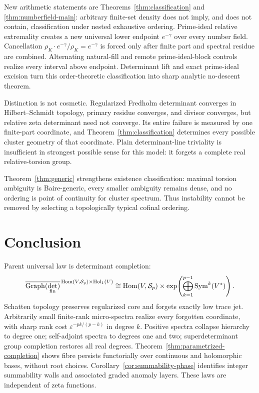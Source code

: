 \documentclass[11pt]{article}
\theoremstyle{definition}
\theoremstyle{remark}
\begin{document}
New arithmetic statements are Theorems~\ref{thm:classification} and
\ref{thm:numberfield-main}: arbitrary finite-set density does not imply, and does not contain,
classification under nested exhaustive ordering.  Prime-ideal relative extremality creates a
new universal lower endpoint $e^{-\gamma}$ over every number field.  Cancellation
$\rho_K\cdot e^{-\gamma}/\rho_K=e^{-\gamma}$ is forced only after finite part and spectral
residue are combined.  Alternating natural-fill and remote prime-ideal-block controls realize
every interval above endpoint.  Determinant lift and exact prime-ideal excision turn this
order-theoretic classification into sharp analytic no-descent theorem.

Distinction is not cosmetic.  Regularized Fredholm determinant converges in Hilbert--Schmidt
topology, primary residue converges, and divisor converges, but relative zeta determinant need
not converge.  Its entire failure is measured by one finite-part coordinate, and
Theorem~\ref{thm:classification} determines every possible cluster geometry of that coordinate.
Plain determinant-line triviality is insufficient in strongest possible sense for this model: it
forgets a complete real relative-torsion group.

Theorem~\ref{thm:generic} strengthens existence classification: maximal torsion ambiguity is
Baire-generic, every smaller ambiguity remains dense, and no ordering is point of continuity for
cluster spectrum.  Thus instability cannot be removed by selecting a topologically typical
cofinal ordering.

\section{Conclusion}

Parent universal law is determinant completion:
\[
 \overline{\operatorname{Graph}(\det_{\rm fin})}^{\,
   \operatorname{Hom}(V,\mathcal S_p)\times\operatorname{Hol}_1(V)}
 \cong
 \operatorname{Hom}(V,\mathcal S_p)\times
 \exp\!\left(\bigoplus_{k=1}^{p-1}\operatorname{Sym}^k(V^*)\right).
\]
Schatten topology preserves regularized core and forgets exactly low trace jet.  Arbitrarily
small finite-rank micro-spectra realize every forgotten coordinate, with sharp rank cost
$\varepsilon^{-pk/(p-k)}$ in degree $k$.  Positive spectra collapse hierarchy to degree one;
self-adjoint spectra to degrees one and two; superdeterminant group completion restores all
real degrees.  Theorem~\ref{thm:parametrized-completion} shows fibre persists functorially over
continuous and holomorphic bases, without root choices.  Corollary~\ref{cor:summability-phase}
identifies integer summability walls and associated graded anomaly layers.  These laws are
independent of zeta functions.
\end{document}
